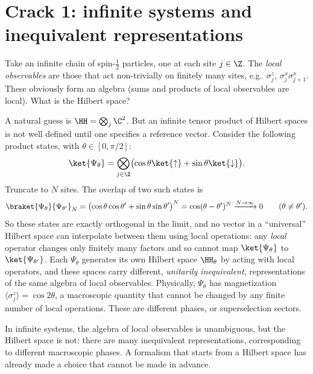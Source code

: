 \section{Crack 1: infinite systems and inequivalent representations}

Take an infinite chain of spin-$\tfrac12$ particles, one at each site $j\in\Z$. The \emph{local observables} are those that act non-trivially on finitely many sites, e.g.\ $\sigma^z_j$, $\sigma^x_j\sigma^x_{j+1}$. These obviously form an algebra (sums and products of local observables are local). What is the Hilbert space?

A natural guess is $\HH=\bigotimes_{j}\C^2$. But an infinite tensor product of Hilbert spaces is not well defined until one specifies a reference vector. Consider the following product states, with $\theta\in[0,\pi/2]$:
\begin{equation}
\ket{\Psi_\theta}=\bigotimes_{j\in\Z}\bigl(\cos\theta\ket{\uparrow}+\sin\theta\ket{\downarrow}\bigr).
\end{equation}
Truncate to $N$ sites. The overlap of two such states is
\begin{equation}
\braket{\Psi_\theta}{\Psi_{\theta'}}_N=\bigl(\cos\theta\cos\theta'+\sin\theta\sin\theta'\bigr)^N=\cos(\theta-\theta')^N\xrightarrow{N\to\infty}0\qquad(\theta\ne\theta').
\end{equation}
So these states are exactly orthogonal in the limit, and no vector in a ``universal'' Hilbert space can interpolate between them using local operations: any \emph{local} operator changes only finitely many factors and so cannot map $\ket{\Psi_\theta}$ to $\ket{\Psi_{\theta'}}$. Each $\Psi_\theta$ generates its own Hilbert space $\HH_\theta$ by acting with local operators, and these spaces carry different, \emph{unitarily inequivalent}, representations of the same algebra of local observables. Physically, $\Psi_\theta$ has magnetization $\langle\sigma^z_j\rangle=\cos 2\theta$, a macroscopic quantity that cannot be changed by any finite number of local operations. These are different phases, or superselection sectors.

\begin{keyidea}
In infinite systems, the algebra of local observables is unambiguous, but the Hilbert space is not: there are many inequivalent representations, corresponding to different macroscopic phases. A formalism that starts from a Hilbert space has already made a choice that cannot be made in advance.
\end{keyidea}

